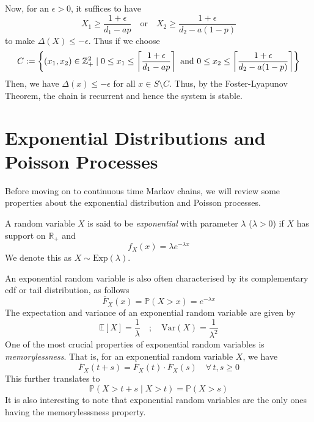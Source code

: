 \documentclass[12pt]{article}
\def\P{\mathbb{P}}
\def\E{\mathbb{E}}
\def\Var{\text{Var}}
\def\ccdf{\overline{F}}
\theoremstyle{definition}
\begin{document}
    Now, for an $\epsilon > 0$, it suffices to have
    \[
        X_1 \geq \frac{1+\epsilon}{d_1 - ap} \quad \text{or} \quad X_2 \geq \frac{1+\epsilon}{d_2 - a(1-p)}
    \]
    to make $\Delta(X) \leq -\epsilon$. Thus if we choose
    \[
        C \vcentcolon= \left\{ (x_1, x_2) \in \mathbb{Z}_+^2 \mid 0 \leq x_1 \leq \left\lceil \frac{1+\epsilon}{d_1 - ap} \right\rceil \text{ and } 0 \leq x_2 \leq \left\lceil \frac{1+\epsilon}{d_2 - a(1-p)} \right\rceil \right\}
    \]
    Then, we have $\Delta(x) \leq -\epsilon$ for all $x \in S \setminus C$. Thus, by the Foster-Lyapunov Theorem, the chain is recurrent and hence the system is stable.
    
    \newpage
    
    \section{Exponential Distributions and Poisson Processes}
    
    Before moving on to continuous time Markov chains, we will review some properties about the exponential distribution and Poisson processes. 
    
    \begin{defn}
        A random variable $X$ is said to be \emph{exponential} with parameter $\lambda$ ($\lambda > 0$) if $X$ has support on $\mathbb{R}_+$ and 
        \[
            f_X(x) = \lambda e^{-\lambda x}
        \]
        We denote this as $X \sim \text{Exp}(\lambda)$.
    \end{defn}
    
    An exponential random variable is also often characterised by its complementary cdf or tail distribution, as follows
    \[
        \ccdf_X(x) = \P(X > x) = e^{-\lambda x}
    \]
    The expectation and variance of an exponential random variable are given by
    \[
        \E[X] = \frac{1}{\lambda} \quad ; \quad \Var(X) = \frac{1}{\lambda^2}
    \]
    One of the most crucial properties of exponential random variables is \emph{memorylessness}. That is, for an exponential random variable $X$, we have
    \[
        \ccdf_X(t+s) = \ccdf_X(t) \cdot \ccdf_X(s) \quad \forall \, t,s \geq 0
    \]
    This further translates to
    \[
        \P(X > t+s \mid X > t) = \P(X > s)
    \]
    It is also interesting to note that exponential random variables are the only ones having the memorylesssness property. 
    
    \medskip
    
\end{document}
